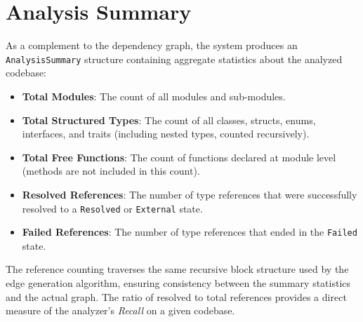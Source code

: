 \section{Analysis Summary}
\label{sec:analysis_summary}

As a complement to the dependency graph, the system produces an \texttt{AnalysisSummary} structure containing aggregate statistics about the analyzed codebase:
\begin{itemize}
  \item \textbf{Total Modules}: The count of all modules and sub-modules.
  \item \textbf{Total Structured Types}: The count of all classes, structs, enums, interfaces, and traits (including nested types, counted recursively).
  \item \textbf{Total Free Functions}: The count of functions declared at module level (methods are not included in this count).
  \item \textbf{Resolved References}: The number of type references that were successfully resolved to a \texttt{Resolved} or \texttt{External} state.
  \item \textbf{Failed References}: The number of type references that ended in the \texttt{Failed} state.
\end{itemize}

The reference counting traverses the same recursive block structure used by the edge generation algorithm, ensuring consistency between the summary statistics and the actual graph. The ratio of resolved to total references provides a direct measure of the analyzer's \textit{Recall} on a given codebase.
